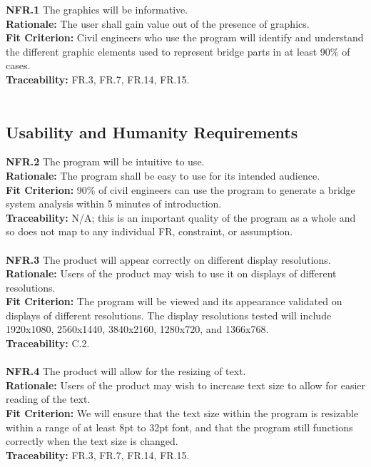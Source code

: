 \documentclass[12pt]{article}
\begin{document}
  \textbf{NFR.1} The graphics will be informative.\\
  \textbf{Rationale:} The user shall gain value out of the presence of graphics.\\
  \textbf{Fit Criterion:} Civil engineers who use the program will identify and understand the different graphic elements used to represent bridge parts in at least 90\% of cases.\\
  \textbf{Traceability:} FR.3, FR.7, FR.14, FR.15.\\\\

\subsection{Usability and Humanity Requirements}

  \textbf{NFR.2} The program will be intuitive to use.\\
  \textbf{Rationale:} The program shall be easy to use for its intended audience.\\
  \textbf{Fit Criterion:} 90\% of civil engineers can use the program to generate a bridge system analysis within 5 minutes of introduction.\\
  \textbf{Traceability:} N/A; this is an important quality of the program as a whole and so does not map to any individual FR, constraint, or assumption.\\\\

  \noindent\textbf{NFR.3} The product will appear correctly on different display resolutions.\\
  \textbf{Rationale:} Users of the product may wish to use it on displays of different resolutions.\\
  \textbf{Fit Criterion:} The program will be viewed and its appearance validated on displays of different resolutions. The display resolutions tested will include 1920x1080,
   2560x1440, 3840x2160, 1280x720, and 1366x768.\\
  \textbf{Traceability:} C.2.\\\\

  \noindent\textbf{NFR.4} The product will allow for the resizing of text.\\
  \textbf{Rationale:} Users of the product may wish to increase text size to allow for easier reading of the text.\\
  \textbf{Fit Criterion:} We will ensure that the text size within the program is resizable within a range of at least 8pt to 32pt font, 
  and that the program still functions correctly when the text size is changed.\\
  \textbf{Traceability:} FR.3, FR.7, FR.14, FR.15.\\\\
\end{document}
